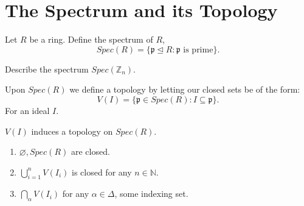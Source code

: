 \documentclass{article}
\theoremstyle{plain}%
\newtheorem[L]{thm}{Theorem}[section]
\newtheorem[L]{lem}[thm]{Lemma}
\newtheorem[L]{prop}[thm]{Proposition}
\theoremstyle{definition}
\newtheorem[M]{defn}{Definition}[section]
\newtheorem[M]{exmp}{Example}[section]
\theoremstyle{remark}
\begin{document}
\section{The Spectrum and its Topology}
\begin{defn}
Let $R$ be a ring. Define the spectrum of $R$,
\[Spec(R)=\{\mathfrak{p}\trianglelefteq R: \mathfrak{p} \text{ is prime}\} .\] 
\end{defn}
\begin{exmp}
    Describe the spectrum $Spec(\mathbb{Z}_n)$.
\end{exmp}
\begin{defn}
    Upon $Spec(R)$ we define a topology by letting our closed sets be of the form:
    \[ V(I)=\{\mathfrak{p}\in Spec(R):I\subseteq \mathfrak{p}\} .\] 
    For an ideal $I$.
\end{defn}
\begin{prop}
    $V(I)$ induces a topology on $Spec(R)$.
    \begin{enumerate}
        \item $\varnothing,Spec(R)$ are closed.
        \item $\bigcup_{i=1}^{n}V(I_i)$ is closed for any $n\in \mathbb{N}$.
        \item $\bigcap_{\alpha}^{}V(I_i)$ for any $\alpha\in \Delta$, some indexing set.
    \end{enumerate}
\end{prop}
\end{document}
